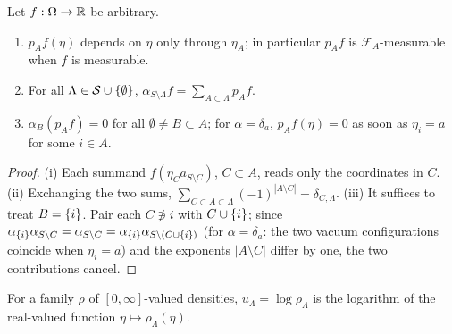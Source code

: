 \begin{lemma}
    \label{lem:grep-mobius-properties}
    \leanok

    Let $f : \Omega \to \mathbb{R}$ be arbitrary.
    \begin{enumerate}
        \item $p_A f(\eta)$ depends on $\eta$ only through $\eta_A$; in particular $p_A f$ is
        $\mathcal{F}_A$-measurable when $f$ is measurable.
        \item For all $\Lambda \in \mathcal{S} \cup \left\{ \emptyset \right\}$,
        $\displaystyle \alpha_{S\setminus\Lambda} f = \sum_{A \subset \Lambda} p_A f$.
        \item $\alpha_B(p_A f) = 0$ for all $\emptyset \neq B \subset A$; for $\alpha = \delta_a$,
        $p_A f(\eta) = 0$ as soon as $\eta_i = a$ for some $i \in A$.
    \end{enumerate}
\end{lemma}
\begin{proof}
    \leanok

    (i) Each summand $f(\eta_C a_{S\setminus C})$, $C \subset A$, reads only the coordinates in
    $C$.  (ii) Exchanging the two sums,
    $\sum_{C \subset A \subset \Lambda}(-1)^{|A \setminus C|} = \delta_{C,\Lambda}$.  (iii) It
    suffices to treat $B = \left\{ i \right\}$.  Pair each $C \not\ni i$ with $C \cup \left\{ i \right\}$; since
    $\alpha_{\left\{ i \right\}}\alpha_{S\setminus C} = \alpha_{S \setminus C}
    = \alpha_{\left\{ i \right\}}\alpha_{S \setminus (C \cup \left\{ i \right\})}$ (for $\alpha = \delta_a$: the two
    vacuum configurations coincide when $\eta_i = a$) and the exponents $|A \setminus C|$ differ
    by one, the two contributions cancel.
\end{proof}

\begin{definition}[$u_\Lambda = \log \rho_\Lambda$]
    \label{def:grep-log-density}
    \leanok

    For a family $\rho$ of $[0,\infty]$-valued densities, $u_\Lambda = \log \rho_\Lambda$ is the
    logarithm of the real-valued function $\eta \mapsto \rho_\Lambda(\eta)$.
\end{definition}

